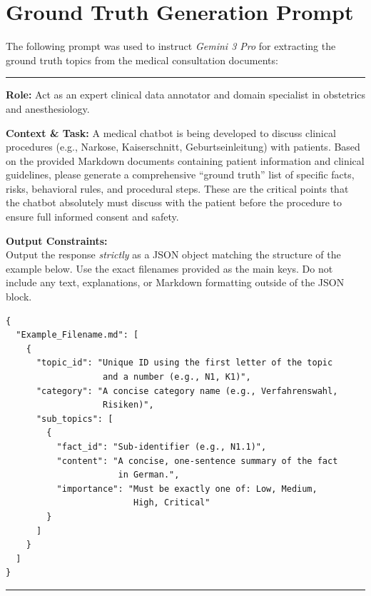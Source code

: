 
\chapter{Ground Truth Generation Prompt}
\label{app:ground_truth_prompt}

The following prompt was used to instruct \textit{Gemini 3 Pro} for extracting the ground truth topics from the medical consultation documents:

\vspace{0.5em}
\hrule
\vspace{0.5em}

\textbf{Role:} Act as an expert clinical data annotator and domain specialist in obstetrics and anesthesiology.

\textbf{Context \& Task:} A medical chatbot is being developed to discuss clinical procedures (e.g., Narkose, Kaiserschnitt, Geburtseinleitung) with patients. Based on the provided Markdown documents containing patient information and clinical guidelines, please generate a comprehensive ``ground truth'' list of specific facts, risks, behavioral rules, and procedural steps. These are the critical points that the chatbot absolutely must discuss with the patient before the procedure to ensure full informed consent and safety.

\textbf{Output Constraints:}\\
Output the response \textit{strictly} as a JSON object matching the structure of the example below. Use the exact filenames provided as the main keys. Do not include any text, explanations, or Markdown formatting outside of the JSON block.

\begin{Verbatim}[fontsize=\small,breaklines=true,breakanywhere=true]
{
  "Example_Filename.md": [
    {
      "topic_id": "Unique ID using the first letter of the topic 
                   and a number (e.g., N1, K1)",
      "category": "A concise category name (e.g., Verfahrenswahl, 
                   Risiken)",
      "sub_topics": [
        {
          "fact_id": "Sub-identifier (e.g., N1.1)",
          "content": "A concise, one-sentence summary of the fact 
                      in German.",
          "importance": "Must be exactly one of: Low, Medium, 
                         High, Critical"
        }
      ]
    }
  ]
}
\end{Verbatim}

\vspace{0.5em}
\hrule
\vspace{0.5em}

